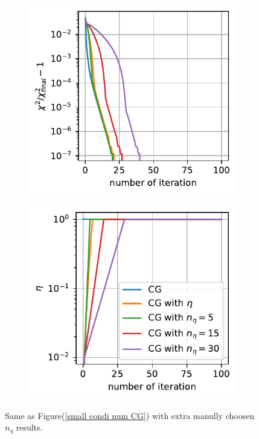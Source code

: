 \documentclass[11pt, letterpaper]{article}
\begin{document}
\begin{figure}[htb]
\begin{subfigure}{0.33\textwidth}
    \includegraphics[width=\linewidth]
        {./images/0.1/small_condition_num/chi2.pdf}
    \caption{}
    \label{small condi num chi2}
\end{subfigure}%
\begin{subfigure}{0.33\textwidth}
    \centering
    \includegraphics[width=\linewidth]
        {./images/0.1/small_condition_num/eta.pdf}
    \caption{}
    \label{small condi num eta}
\end{subfigure}
\caption{Same as Figure(\ref{small condi num CG}) with extra manully choosen 
    $n_{\eta}$ results.
}
\label{small condi num}
\end{figure}
\end{document}
